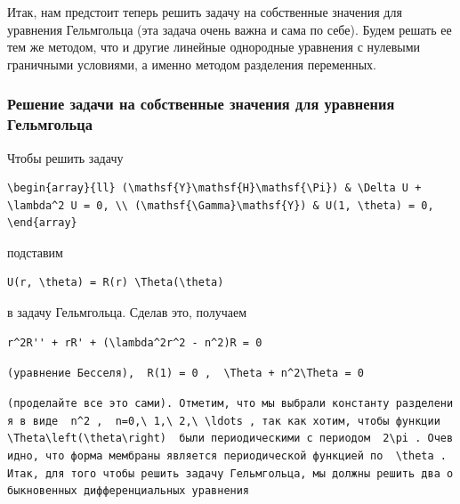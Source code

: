 \documentclass[
  ukrainian,
]{article}
\begin{document}
Итак, нам предстоит теперь решить задачу на собственные значения для
уравнения Гельмгольца (эта задача очень важна и сама по себе). Будем
решать ее тем же методом, что и другие линейные однородные уравнения с
нулевыми граничными условиями, а именно методом разделения переменных.

\subsubsection{Решение задачи на собственные значения для уравнения
Гельмгольца}\label{ux440ux435ux448ux435ux43dux438ux435-ux437ux430ux434ux430ux447ux438-ux43dux430-ux441ux43eux431ux441ux442ux432ux435ux43dux43dux44bux435-ux437ux43dux430ux447ux435ux43dux438ux44f-ux434ux43bux44f-ux443ux440ux430ux432ux43dux435ux43dux438ux44f-ux433ux435ux43bux44cux43cux433ux43eux43bux44cux446ux430}

Чтобы решить задачу

\begin{verbatim}
\begin{array}{ll} (\mathsf{Y}\mathsf{H}\mathsf{\Pi}) & \Delta U + \lambda^2 U = 0, \\ (\mathsf{\Gamma}\mathsf{Y}) & U(1, \theta) = 0, \end{array}
\end{verbatim}

подставим

\begin{verbatim}
U(r, \theta) = R(r) \Theta(\theta)
\end{verbatim}

в задачу Гельмгольца. Сделав это, получаем

\begin{verbatim}
r^2R'' + rR' + (\lambda^2r^2 - n^2)R = 0
\end{verbatim}

\texttt{(уравнение\ Бесселя),\ \ \textquotesingle{}R(1)\ =\ 0\textquotesingle{}\ ,\ \ \textquotesingle{}\textbackslash{}Theta\textquotesingle{}\textquotesingle{}\ +\ n\^{}2\textbackslash{}Theta\ =\ 0\textquotesingle{}}

\texttt{(проделайте\ все\ это\ сами).\ Отметим,\ что\ мы\ выбрали\ константу\ разделения\ в\ виде\ \ \textquotesingle{}n\^{}2\textquotesingle{}\ ,\ \ \textquotesingle{}n=0,\textbackslash{}\ 1,\textbackslash{}\ 2,\textbackslash{}\ \textbackslash{}ldots\textquotesingle{}\ ,\ так\ как\ хотим,\ чтобы\ функции\ \ \textquotesingle{}\textbackslash{}Theta\textbackslash{}left(\textbackslash{}theta\textbackslash{}right)\textquotesingle{}\ \ были\ периодическими\ с\ периодом\ \ \textquotesingle{}2\textbackslash{}pi\textquotesingle{}\ .\ Очевидно,\ что\ форма\ мембраны\ является\ периодической\ функцией\ по\ \ \textquotesingle{}\textbackslash{}theta\textquotesingle{}\ .\ Итак,\ для\ того\ чтобы\ решить\ задачу\ Гельмгольца,\ мы\ должны\ решить\ два\ обыкновенных\ дифференциальных\ уравнения}
\end{document}
